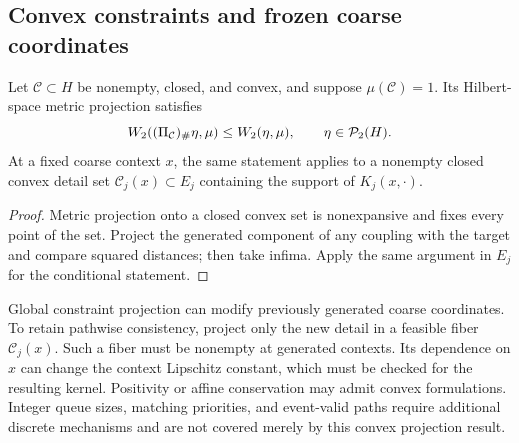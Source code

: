 \subsection{Convex constraints and frozen coarse coordinates}
\begin{proposition}\label{prop:constraints}
Let $\mathcal C\subset H$ be nonempty, closed, and convex, and suppose $\mu(\mathcal C)=1$. Its Hilbert-space metric projection satisfies
\begin{equation}
 W_2((\Pi_{\mathcal C})_{\#}\eta,\mu)\le W_2(\eta,\mu),
 \qquad \eta\in\mathcal P_2(H).
\end{equation}
At a fixed coarse context $x$, the same statement applies to a nonempty closed convex detail set $\mathcal C_j(x)\subset E_j$ containing the support of $K_j(x,\cdot)$.
\end{proposition}
\begin{proof}
Metric projection onto a closed convex set is nonexpansive and fixes every point of the set. Project the generated component of any coupling with the target and compare squared distances; then take infima. Apply the same argument in $E_j$ for the conditional statement.
\end{proof}
Global constraint projection can modify previously generated coarse coordinates. To retain pathwise consistency, project only the new detail in a feasible fiber $\mathcal C_j(x)$. Such a fiber must be nonempty at generated contexts. Its dependence on $x$ can change the context Lipschitz constant, which must be checked for the resulting kernel. Positivity or affine conservation may admit convex formulations. Integer queue sizes, matching priorities, and event-valid paths require additional discrete mechanisms and are not covered merely by this convex projection result.

